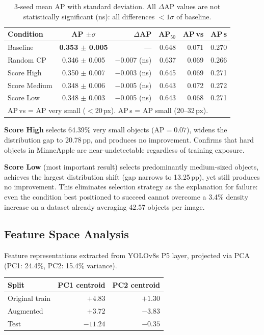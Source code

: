 \documentclass[10pt, a4paper]{article}
\begin{document}
\begin{table}[H]
\centering
\small
\caption{3-seed mean AP with standard deviation.
  All $\Delta$AP values are not statistically significant (ns):
  all differences $<1\sigma$ of baseline.}
\begin{tabular}{lcrrrr}
\toprule
\textbf{Condition} & \textbf{AP $\pm\sigma$} & $\Delta$\textbf{AP}
  & \textbf{AP$_{50}$} & \textbf{AP\,vs} & \textbf{AP\,s} \\
\midrule
Baseline      & \textbf{0.353 $\pm$ 0.005} & ---
  & 0.648 & 0.071 & 0.270 \\
Random CP     & 0.346 $\pm$ 0.005 & $-$0.007 (ns) & 0.637 & 0.069 & 0.266 \\
Score High    & 0.350 $\pm$ 0.007 & $-$0.003 (ns) & 0.645 & 0.069 & 0.271 \\
Score Medium  & 0.348 $\pm$ 0.006 & $-$0.005 (ns) & 0.643 & 0.072 & 0.272 \\
Score Low     & 0.348 $\pm$ 0.003 & $-$0.005 (ns) & 0.643 & 0.068 & 0.271 \\
\bottomrule
\multicolumn{6}{l}{\small AP\,vs = AP very small ($<$20\,px).
  AP\,s = AP small (20--32\,px).}
\end{tabular}
\end{table}

\textbf{Score High} selects 64.39\% very small objects (AP$=0.07$),
widens the distribution gap to 20.78\,pp, and produces no improvement.
Confirms that hard objects in MinneApple are near-undetectable
regardless of training exposure.

\textbf{Score Low} (most important result) selects predominantly
medium-sized objects, achieves the largest distribution shift
(gap narrows to 13.25\,pp), yet still produces no improvement.
This eliminates selection strategy as the explanation for failure:
even the condition best positioned to succeed cannot overcome
a 3.4\% density increase on a dataset already averaging 42.57 objects
per image.

\subsection{Feature Space Analysis}

Feature representations extracted from YOLOv8s P5 layer,
projected via PCA (PC1: 24.4\%, PC2: 15.4\% variance).

\begin{center}
\small
\begin{tabular}{lrr}
\toprule
\textbf{Split} & \textbf{PC1 centroid} & \textbf{PC2 centroid} \\
\midrule
Original train  & $+4.83$ & $+1.30$ \\
Augmented       & $+3.72$ & $-3.83$ \\
Test            & $-11.24$ & $-0.35$ \\
\bottomrule
\end{tabular}
\end{center}
\end{document}
